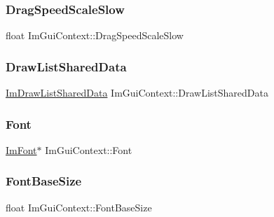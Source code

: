 \subsubsection{\texorpdfstring{Drag\+Speed\+Scale\+Slow}{DragSpeedScaleSlow}}
{\footnotesize\ttfamily float Im\+Gui\+Context\+::\+Drag\+Speed\+Scale\+Slow}

\hypertarget{struct_im_gui_context_a71045e6879ff2d074836273ba00674e6}{}\label{struct_im_gui_context_a71045e6879ff2d074836273ba00674e6} 
\subsubsection{\texorpdfstring{Draw\+List\+Shared\+Data}{DrawListSharedData}}
{\footnotesize\ttfamily \hyperlink{struct_im_draw_list_shared_data}{Im\+Draw\+List\+Shared\+Data} Im\+Gui\+Context\+::\+Draw\+List\+Shared\+Data}

\hypertarget{struct_im_gui_context_aec64e774018a7d74515baeb9e06fb4e3}{}\label{struct_im_gui_context_aec64e774018a7d74515baeb9e06fb4e3} 
\subsubsection{\texorpdfstring{Font}{Font}}
{\footnotesize\ttfamily \hyperlink{struct_im_font}{Im\+Font}$\ast$ Im\+Gui\+Context\+::\+Font}

\hypertarget{struct_im_gui_context_a0fcbda57d25b80111283ed7305ee3ee8}{}\label{struct_im_gui_context_a0fcbda57d25b80111283ed7305ee3ee8} 
\subsubsection{\texorpdfstring{Font\+Base\+Size}{FontBaseSize}}
{\footnotesize\ttfamily float Im\+Gui\+Context\+::\+Font\+Base\+Size}

\hypertarget{struct_im_gui_context_af4022d1866887cdc400131fc6a65b200}{}\label{struct_im_gui_context_af4022d1866887cdc400131fc6a65b200} 
